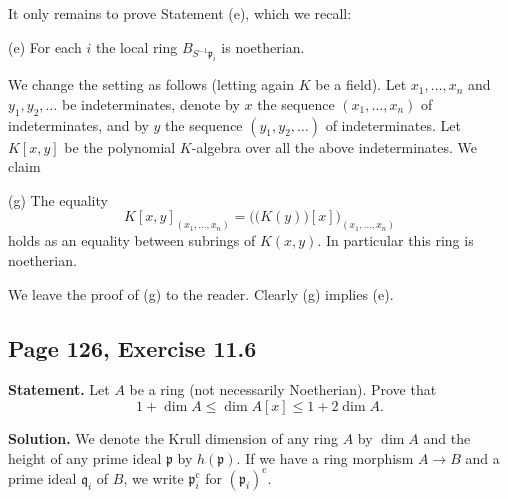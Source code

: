 \documentclass[parskip=half,fontsize=12pt]{scrartcl}%
\newcommand{\oo}{\operatorname}\newcommand{\ooo}{\operatorname*}
\newcommand{\mf}{\mathfrak}
\newcommand{\ppp}{\mf p}
\newcommand{\qqq}{\mf q}
\newcommand{\Spec}{\operatorname{Spec}}\newcommand{\Sp}{\operatorname{Spec}}
\newtheorem{note}[thm]{Note}
\begin{document}
It only remains to prove Statement (e), which we recall:

(e) For each $i$ the local ring $B_{S^{-1}\ppp_i}$ is noetherian.

We change the setting as follows (letting again $K$ be a field). Let $x_1,\ldots,x_n$ and $y_1,y_2,\ldots$ be indeterminates, denote by $x$ the sequence $(x_1,\ldots,x_n)$ of indeterminates, and by $y$ the sequence $(y_1,y_2,\ldots)$ of indeterminates. Let $K[x,y]$ be the polynomial $K$-algebra over all the above indeterminates. We claim 

(g) The equality 
$$
K[x,y]_{(x_1,\ldots,x_n)}=\Big(\big(K(y)\big)[x]\Big)_{(x_1,\ldots,x_n)}
$$ 
holds as an equality between subrings of $K(x,y)$. In particular this ring is noetherian. 

We leave the proof of (g) to the reader. Clearly (g) implies (e). 

\subsection{Page 126, Exercise 11.6}\label{116}%

\textbf{Statement.} Let $A$ be a ring (not necessarily Noetherian). Prove that 
$$
1+\dim A\le\dim A[x]\le1+2\dim A.
$$

\textbf{Solution.} We denote the Krull dimension of any ring $A$ by $\dim A$ and the height of any prime ideal $\ppp$ by $h(\ppp)$. If we have a ring morphism $A\to B$ and a prime ideal $\qqq_i$ of $B$, we write $\ppp_i^{\oo c}$ for $(\ppp_i)^{\oo c}$. 



\end{document}
